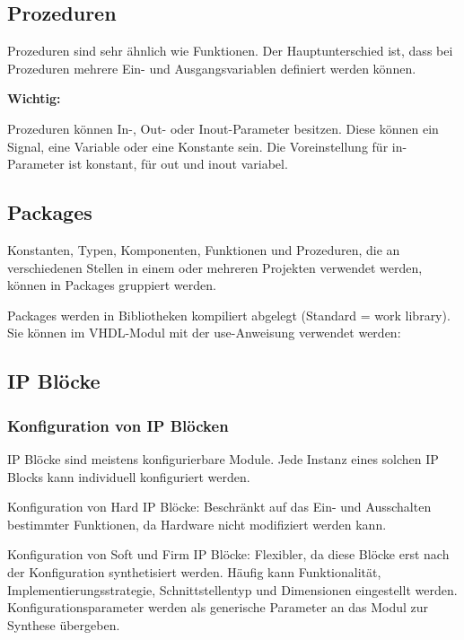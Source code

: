 \subsection{Prozeduren}
Prozeduren sind sehr ähnlich wie Funktionen. Der Hauptunterschied ist, dass bei Prozeduren mehrere Ein- und Ausgangsvariablen definiert werden können. 

\textbf{Wichtig: }
\begin{compactitem}
    \item Prozeduren können In-, Out- oder Inout-Parameter besitzen. Diese können ein Signal, eine Variable oder eine Konstante sein. Die Voreinstellung für in-Parameter ist konstant, für out und inout variabel.
\end{compactitem}

\subsection{Packages}
Konstanten, Typen, Komponenten, Funktionen und Prozeduren, die an verschiedenen Stellen in einem oder mehreren Projekten verwendet werden, können in Packages gruppiert werden.

Packages werden in Bibliotheken kompiliert abgelegt (Standard = work library). Sie können im VHDL-Modul mit der use-Anweisung verwendet werden:


\subsection{IP Blöcke}
\subsubsection{Konfiguration von IP Blöcken}
\begin{compactitem}
    \item IP Blöcke sind meistens konfigurierbare Module. Jede Instanz eines solchen IP Blocks kann individuell konfiguriert werden.
    \item Konfiguration von Hard IP Blöcke: Beschränkt auf das Ein- und Ausschalten bestimmter Funktionen, da Hardware nicht modifiziert werden kann.
    \item Konfiguration von Soft und Firm IP Blöcke: Flexibler, da diese Blöcke erst nach der Konfiguration synthetisiert werden. Häufig kann Funktionalität, Implementierungsstrategie, Schnittstellentyp und Dimensionen eingestellt werden. Konfigurationsparameter werden als generische Parameter an das Modul zur Synthese übergeben.  
\end{compactitem}
